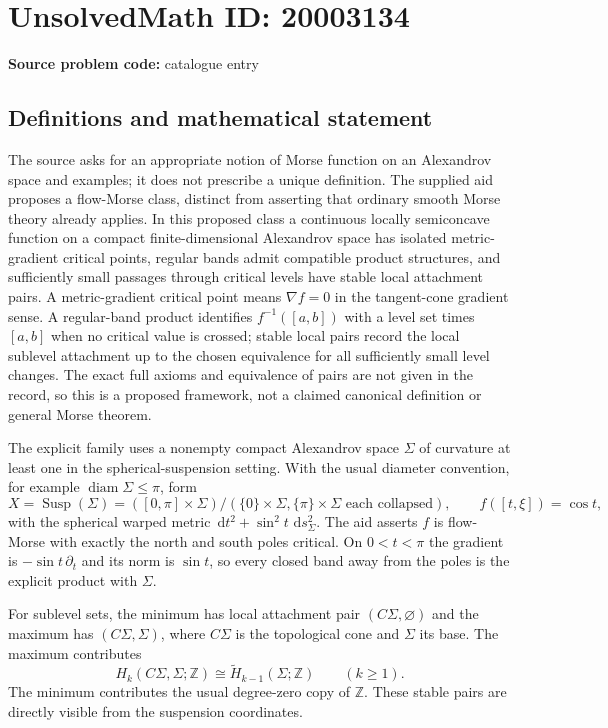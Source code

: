 \documentclass[11pt]{article}
\newcommand{\Z}{\mathbb{Z}}
\newcommand{\dd}{\,\mathrm{d}}
\begin{document}
\section*{UnsolvedMath ID: 20003134}
\textbf{Source problem code:} catalogue entry
\subsection{Definitions and mathematical statement}
The source asks for an appropriate notion of Morse function on an Alexandrov space and examples; it does not prescribe a unique definition. The supplied aid proposes a flow-Morse class, distinct from asserting that ordinary smooth Morse theory already applies. In this proposed class a continuous locally semiconcave function on a compact finite-dimensional Alexandrov space has isolated metric-gradient critical points, regular bands admit compatible product structures, and sufficiently small passages through critical levels have stable local attachment pairs. A metric-gradient critical point means $\nabla f=0$ in the tangent-cone gradient sense. A regular-band product identifies $f^{-1}([a,b])$ with a level set times $[a,b]$ when no critical value is crossed; stable local pairs record the local sublevel attachment up to the chosen equivalence for all sufficiently small level changes. The exact full axioms and equivalence of pairs are not given in the record, so this is a proposed framework, not a claimed canonical definition or general Morse theorem.

The explicit family uses a nonempty compact Alexandrov space $\Sigma$ of curvature at least one in the spherical-suspension setting. With the usual diameter convention, for example $\operatorname{diam}\Sigma\leq\pi$, form
\[
X=\operatorname{Susp}(\Sigma)=([0,\pi]\times\Sigma)/(\{0\}\times\Sigma,\{\pi\}\times\Sigma\text{ each collapsed}),
\qquad f([t,\xi])=\cos t,
\]
with the spherical warped metric $\dd t^2+\sin^2t\,\dd s_\Sigma^2$. The aid asserts $f$ is flow-Morse with exactly the north and south poles critical. On $0<t<\pi$ the gradient is $-\sin t\,\partial_t$ and its norm is $\sin t$, so every closed band away from the poles is the explicit product with $\Sigma$.

For sublevel sets, the minimum has local attachment pair $(C\Sigma,\varnothing)$ and the maximum has $(C\Sigma,\Sigma)$, where $C\Sigma$ is the topological cone and $\Sigma$ its base. The maximum contributes
\[
H_k(C\Sigma,\Sigma;\Z)\cong\widetilde H_{k-1}(\Sigma;\Z)\qquad(k\geq1).
\]
The minimum contributes the usual degree-zero copy of $\Z$. These stable pairs are directly visible from the suspension coordinates.
\end{document}
